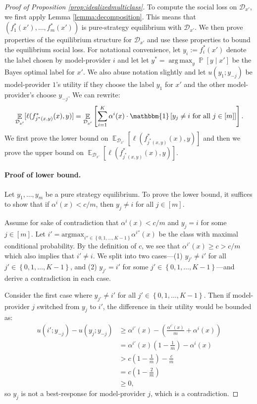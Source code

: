 \documentclass[letterpaper,11pt]{article}
\theoremstyle{plain}
\DeclareMathOperator*{\argmax}{arg\,max}
\DeclareMathOperator*{\E}{\mathbb{E}}
\DeclareMathOperator*{\Prob}{\mathbb{P}}
\begin{document}
\begin{proof}[Proof of Proposition \ref{prop:idealizedmulticlass}]
To compute the social loss on $\mathcal{D}_{x'}$, we first apply Lemma \ref{lemma:decomposition}. This means that $(f^*_1(x'), \ldots, f^*_m(x'))$ is pure-strategy equilibrium with $\mathcal{D}_{x'}$. We then prove properties of the equilibrium structure for $\mathcal{D}_{x'}$ and use these properties to bound the equilibrium social loss. For notational convenience, let $y_i := f^*_i(x')$ denote the label chosen by model-provider $i$ and let 
let $y^* =  \argmax_{y} \Prob[y \mid x']$ be the Bayes optimal label for $x'$. We also abuse notation slightly and let $u(y_1; y_{-j})$ be model-provider $1$'s utility if they choose the label $y_1$ for $x'$ and the other model-provider's choose $y_{-j}$. We can rewrite:
\[\E_{\mathcal{D}_{x'}}[\ell(f^*_{j^*(x,y)}(x), y)] = \E_{\mathcal{D}_{x'}}\left[\sum_{i=1}^K \alpha^i(x) \cdot \mathbbm{1}\left[y_j \neq i \text{ for all } j \in [m] \right] \right]. \]
We first prove the lower bound on $\E_{\mathcal{D}_{x'}}[\ell(f^*_{j^*(x,y)}(x), y)]$ and then we prove the upper bound on $\E_{\mathcal{D}_{x'}}[\ell(f^*_{j^*(x,y)}(x), y)]$.

\paragraph{Proof of lower bound.} Let $y_1, \ldots, y_m$ be a pure strategy equilibrium. To prove the lower bound, it suffices to show that if $\alpha^i(x) < c/m$, then $y_j \neq i$ for all $j \in [m]$. 

Assume for sake of contradiction that $\alpha^i(x) < c/m$ and $y_j = i$ for some $j \in [m]$. Let $i' = \text{argmax}_{i'' \in \left\{0, 1, \ldots, K-1\right\}} \alpha^{i''}(x)$ be the class with maximal conditional probability. By the definition of $c$, we see that $ \alpha^{i'}(x) \ge c > c/m$ which also implies that $i' \neq i$. We split into two cases---(1) $y_{j'} \neq i'$ for all $j' \in \left\{0, 1, \ldots, K-1\right\}$, and (2)  $y_{j'} = i'$ for some $j' \in \left\{0, 1, \ldots, K-1\right\}$---and derive a contradiction in each case.


Consider the first case where $y_{j'} \neq i'$ for all $j' \in \left\{0, 1, \ldots, K-1\right\}$. Then if model-provider $j$ switched from $y_j$ to $i'$, the difference in their utility would be bounded as: 
\begin{align*}
u(i'; y_{-j}) - u(y_j; y_{-j}) &\ge \alpha^{i'}(x) - \left(\frac{\alpha^{i'}(x)}{m} + \alpha^i(x)\right) \\
&= \alpha^{i'}(x) \left(1 - \frac{1}{m} \right) - \alpha^i(x)\\
&> c \left(1 - \frac{1}{m}\right) - \frac{c}{m} \\
&= c \left(1 - \frac{2}{m}\right) \\
&\ge 0,  
\end{align*}
so $y_j$ is not a best-response for model-provider $j$, which is a contradiction. 


\end{proof}
\end{document}
